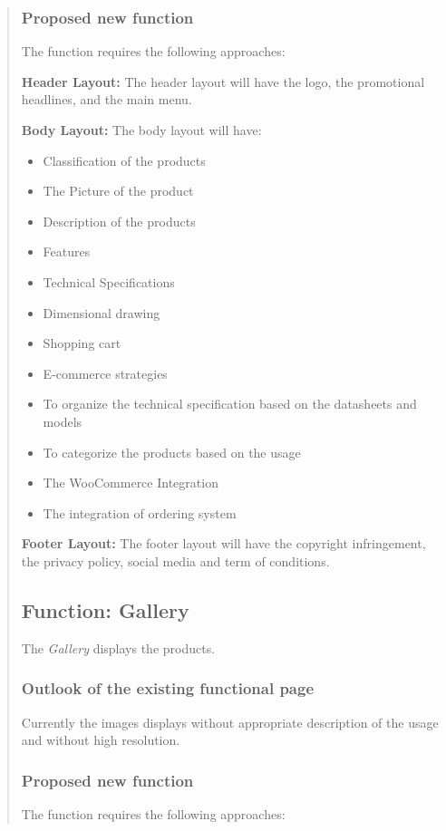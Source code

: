 \documentclass[35pt]{report}
\begin{document}
\begin{quote}
				\subsubsection{Proposed new function}
				The function requires the following approaches:

				{\bfseries Header Layout:} The header layout will have the logo, the promotional headlines, and the main menu.     

				{\bfseries Body Layout:} The body layout will have:
				\begin{itemize}
					\item Classification of the products 
					\item The Picture of the product 
					\item  Description of the products 
					\item  Features 
					\item  Technical Specifications 
					\item  Dimensional drawing 
					\item  Shopping cart 
					\item  E-commerce strategies 
					\item  To organize the technical specification based on the datasheets and models 
					\item  To categorize the products based on the usage 
					\item  The WooCommerce Integration 
					\item  The integration of ordering system 
				\end{itemize}

				{\bfseries Footer Layout:} The footer layout will have the copyright infringement, the privacy policy, social media and term of conditions.

			\subsection{Function: Gallery}
				The {\it Gallery} displays the products. 

				\subsubsection{Outlook of the existing functional page}
				Currently the images displays without appropriate description of the usage and 
without high resolution. 

				\subsubsection{Proposed new function}
				The function requires the following approaches:


\end{quote}
\end{document}
